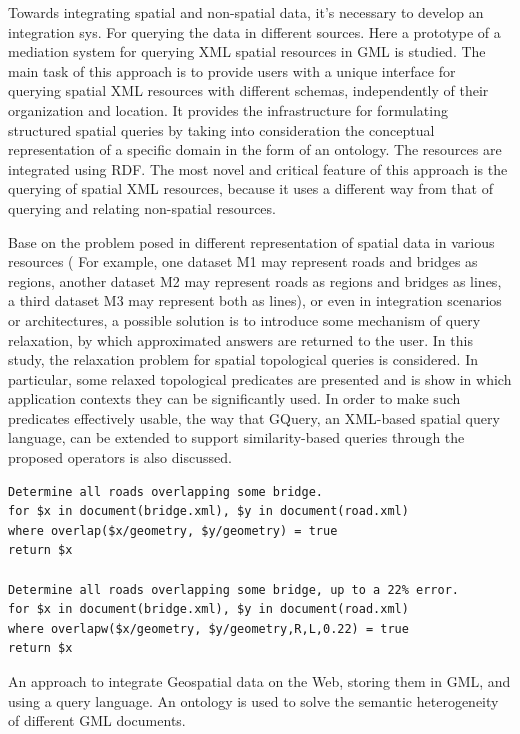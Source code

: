 \documentclass[a4paper,12pt]{article}
\begin{document}
\cite{corcoles2004} Towards integrating spatial and non-spatial data, it's necessary to develop an integration sys. For querying the data in different sources. Here a prototype of a mediation system for querying XML spatial resources in GML is studied.  The main task of this approach is to provide users with a unique interface for querying spatial XML resources with different schemas, independently of their organization and location. It provides the infrastructure for formulating structured spatial queries by taking into consideration the conceptual representation of a specific domain in the form of an ontology. The resources are integrated using RDF. The most novel and critical feature of this approach is the querying of spatial XML resources, because it uses a different way from that of querying and relating non-spatial resources.

\cite{belussi2006} Base on the problem posed in different representation of spatial data in various resources ( For example, one dataset M1 may represent roads and bridges as regions, another dataset M2 may represent roads as regions and bridges as lines, a third dataset M3 may represent both as lines), or even in integration scenarios or architectures, a possible solution is to introduce some mechanism of query relaxation, by which approximated answers are returned to the user. In this study, the relaxation problem for spatial topological queries is considered. In particular,  some relaxed topological predicates are presented and is show in which application contexts they can be significantly used. In order to make such predicates effectively usable, the way that GQuery, an XML-based spatial query language, can be extended to support similarity-based queries through the proposed operators is also discussed.

\begin{verbatim}
Determine all roads overlapping some bridge.
for $x in document(bridge.xml), $y in document(road.xml)
where overlap($x/geometry, $y/geometry) = true
return $x

Determine all roads overlapping some bridge, up to a 22% error.
for $x in document(bridge.xml), $y in document(road.xml)
where overlapw($x/geometry, $y/geometry,R,L,0.22) = true
return $x 
\end{verbatim}

\cite{corcoles2003} An approach to integrate Geospatial data on the Web, storing them in GML, and using a query language. An ontology is used to solve the semantic heterogeneity of different GML documents.
\end{document}
